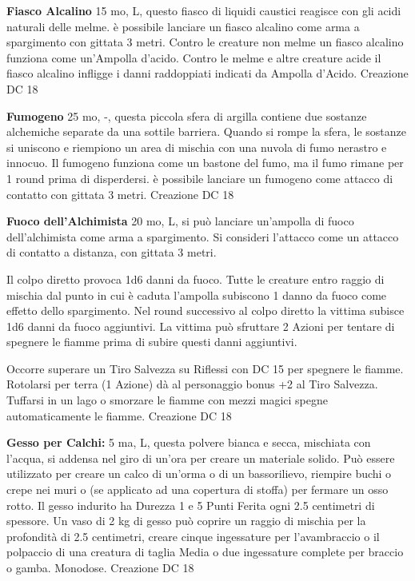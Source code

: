 \documentclass[a4paper,11pt,twoside,openany]{book}
\begin{document}
{\textbf{Fiasco Alcalino} 15 mo, L, questo fiasco di liquidi caustici reagisce con gli acidi naturali delle melme. è possibile lanciare un fiasco alcalino come arma a spargimento con gittata 3 metri. Contro le creature non melme un fiasco alcalino funziona come un'Ampolla d'acido. Contro le melme e altre creature acide il fiasco alcalino infligge i danni raddoppiati indicati da Ampolla d'Acido. Creazione DC 18

\textbf{Fumogeno} 25 mo, -, questa piccola sfera di argilla contiene due sostanze alchemiche separate da una sottile barriera. Quando si rompe la sfera, le sostanze si uniscono e riempiono un area di mischia con una nuvola di fumo nerastro e innocuo. Il fumogeno funziona come un bastone del fumo, ma il fumo rimane per 1 round prima di disperdersi. è possibile lanciare un fumogeno come attacco di contatto con gittata 3 metri. Creazione DC 18

\textbf{Fuoco dell'Alchimista} 20 mo, L, si può lanciare un'ampolla di fuoco dell'alchimista come arma a spargimento. Si consideri l'attacco come un attacco di contatto a distanza, con gittata 3 metri.

Il colpo diretto provoca 1d6 danni da fuoco. Tutte le creature entro raggio di mischia dal punto in cui è caduta l'ampolla subiscono 1 danno da fuoco come effetto dello spargimento. Nel round successivo al colpo diretto la vittima subisce 1d6 danni da fuoco aggiuntivi. La vittima può sfruttare 2 Azioni per tentare di spegnere le fiamme prima di subire questi danni aggiuntivi. 

Occorre superare un Tiro Salvezza su Riflessi con DC 15 per spegnere le fiamme. Rotolarsi per terra (1 Azione) dà al personaggio bonus +2 al Tiro Salvezza. Tuffarsi in un lago o smorzare le fiamme con mezzi magici spegne automaticamente le fiamme. Creazione DC 18

\textbf{Gesso per Calchi:} 5 ma, L, questa polvere bianca e secca, mischiata con l’acqua, si addensa nel giro di un’ora per creare un materiale solido. Può essere utilizzato per creare un calco di un’orma o di un bassorilievo, riempire buchi o crepe nei muri o (se applicato ad una copertura di stoffa) per fermare un osso rotto. Il gesso indurito ha Durezza 1 e 5 Punti Ferita ogni 2.5 centimetri di spessore. Un vaso di 2 kg di gesso può coprire un raggio di mischia per la profondità di 2.5 centimetri, creare cinque ingessature per l’avambraccio o il polpaccio di una creatura di taglia Media o due ingessature complete per braccio o gamba. Monodose. Creazione DC 18

}
\end{document}
